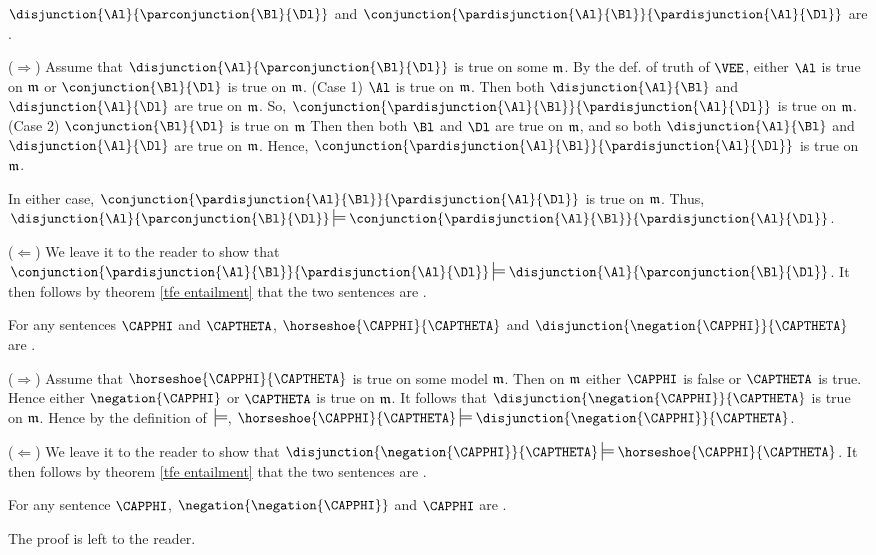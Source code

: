 \begin{majorILnc}{}
$\disjunction{\Al}{\parconjunction{\Bl}{\Dl}}$ and $\conjunction{\pardisjunction{\Al}{\Bl}}{\pardisjunction{\Al}{\Dl}}$ are .
\end{majorILnc}
\begin{PROOF}
($\Rightarrow$) Assume that $\disjunction{\Al}{\parconjunction{\Bl}{\Dl}}$ is true on some $\mathfrak{m}$. 
By the def. of truth of $\VEE$, either $\Al$ is true on $\mathfrak{m}$ or $\conjunction{\Bl}{\Dl}$ is true on $\mathfrak{m}$.
(Case 1) $\Al$ is true on $\mathfrak{m}$.
Then both $\disjunction{\Al}{\Bl}$ and $\disjunction{\Al}{\Dl}$ are true on $\mathfrak{m}$.
So, $\conjunction{\pardisjunction{\Al}{\Bl}}{\pardisjunction{\Al}{\Dl}}$ is true on $\mathfrak{m}$.
(Case 2) $\conjunction{\Bl}{\Dl}$ is true on $\mathfrak{m}$
Then then both $\Bl$ and $\Dl$ are true on $\mathfrak{m}$, and so both $\disjunction{\Al}{\Bl}$ and $\disjunction{\Al}{\Dl}$ are true on $\mathfrak{m}$.
Hence, $\conjunction{\pardisjunction{\Al}{\Bl}}{\pardisjunction{\Al}{\Dl}}$ is true on $\mathfrak{m}$. 

In either case, $\conjunction{\pardisjunction{\Al}{\Bl}}{\pardisjunction{\Al}{\Dl}}$ is true on $\mathfrak{m}$.
Thus, $\disjunction{\Al}{\parconjunction{\Bl}{\Dl}}\sdtstile{}{}\conjunction{\pardisjunction{\Al}{\Bl}}{\pardisjunction{\Al}{\Dl}}$.

($\Leftarrow$) We leave it to the reader to show that $\conjunction{\pardisjunction{\Al}{\Bl}}{\pardisjunction{\Al}{\Dl}}\sdtstile{}{}\disjunction{\Al}{\parconjunction{\Bl}{\Dl}}$. 
It then follows by theorem \ref{tfe entailment} that the two sentences are .
\end{PROOF}
\begin{majorILnc}{}
For any \GSL{} sentences $\CAPPHI$ and $\CAPTHETA$, $\horseshoe{\CAPPHI}{\CAPTHETA}$ and $\disjunction{\negation{\CAPPHI}}{\CAPTHETA}$ are .
\end{majorILnc}
\begin{PROOF}
($\Rightarrow$) Assume that $\horseshoe{\CAPPHI}{\CAPTHETA}$ is true on some model $\mathfrak{m}$.
Then on $\mathfrak{m}$ either $\CAPPHI$ is false or $\CAPTHETA$ is true. 
Hence either $\negation{\CAPPHI}$ or $\CAPTHETA$ is true on $\mathfrak{m}$. 
It follows that $\disjunction{\negation{\CAPPHI}}{\CAPTHETA}$ is true on $\mathfrak{m}$. 
Hence by the definition of $\:\sdtstile{}{}$, $\horseshoe{\CAPPHI}{\CAPTHETA}\sdtstile{}{}\disjunction{\negation{\CAPPHI}}{\CAPTHETA}$.

($\Leftarrow$) We leave it to the reader to show that $\disjunction{\negation{\CAPPHI}}{\CAPTHETA}\sdtstile{}{}\horseshoe{\CAPPHI}{\CAPTHETA}$.
It then follows by theorem \ref{tfe entailment} that the two sentences are .
\end{PROOF}
\begin{majorILnc}{}
For any \GSL{} sentence $\CAPPHI$, $\negation{\negation{\CAPPHI}}$ and $\CAPPHI$ are .
\end{majorILnc}
\begin{PROOF}
The proof is left to the reader.
\end{PROOF}

